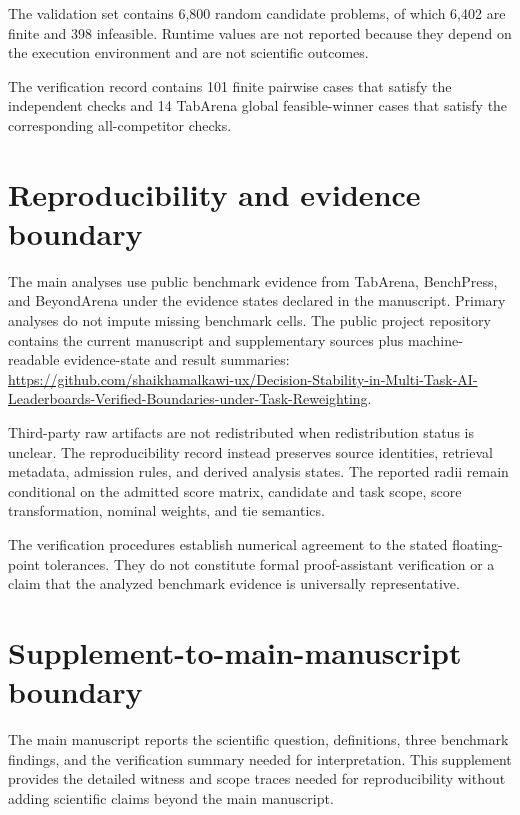 \documentclass[11pt]{article}
\begin{document}
The validation set contains 6,800 random candidate problems, of which 6,402 are finite and 398 infeasible. Runtime values are not reported because they depend on the execution environment and are not scientific outcomes.

The verification record contains 101 finite pairwise cases that satisfy the independent checks and 14 TabArena global feasible-winner cases that satisfy the corresponding all-competitor checks.

\section{Reproducibility and evidence boundary}
The main analyses use public benchmark evidence from TabArena, BenchPress, and BeyondArena under the evidence states declared in the manuscript. Primary analyses do not impute missing benchmark cells. The public project repository contains the current manuscript and supplementary sources plus machine-readable evidence-state and result summaries: \url{https://github.com/shaikhamalkawi-ux/Decision-Stability-in-Multi-Task-AI-Leaderboards-Verified-Boundaries-under-Task-Reweighting}.

Third-party raw artifacts are not redistributed when redistribution status is unclear. The reproducibility record instead preserves source identities, retrieval metadata, admission rules, and derived analysis states. The reported radii remain conditional on the admitted score matrix, candidate and task scope, score transformation, nominal weights, and tie semantics.

The verification procedures establish numerical agreement to the stated floating-point tolerances. They do not constitute formal proof-assistant verification or a claim that the analyzed benchmark evidence is universally representative.

\section*{Supplement-to-main-manuscript boundary}
The main manuscript reports the scientific question, definitions, three benchmark findings, and the verification summary needed for interpretation. This supplement provides the detailed witness and scope traces needed for reproducibility without adding scientific claims beyond the main manuscript.
\end{document}
